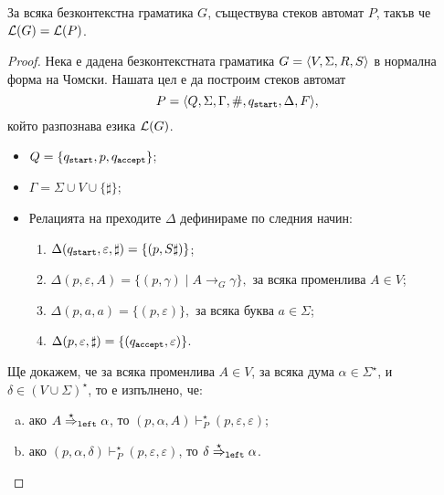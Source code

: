 \begin{important}
  \begin{lemma}
    За всяка безконтекстна граматика $G$,
    съществува стеков автомат $P$, такъв че $\mathcal{L}(G) = \mathcal{L}(P)$.
  \end{lemma}
\end{important}
\begin{proof}
  Нека е дадена безконтекстната граматика $G = \langle{V,\Sigma,R,S}\rangle$ в нормална форма на Чомски.
  Нашата цел е да построим стеков автомат
  \[P = \langle{Q,\Sigma,\Gamma,\#,q_{\texttt{start}},\Delta,F}\rangle,\] който разпознава езика $\mathcal{L}(G)$.
  \begin{itemize}
  \item
    $Q = \{q_{\texttt{start}},p,q_{\texttt{accept}}\}$;
  \item
    $\Gamma = \Sigma \cup V \cup \{\sharp\}$;
  \item
    Релацията на преходите $\Delta$ дефинираме по следния начин:
    \begin{enumerate}[(1)]
    \item 
      $\Delta(q_{\texttt{start}}, \varepsilon, \sharp ) = \{(p,S\sharp)\}$;
    \item
      $\Delta(p,\varepsilon,A) = \{(p,\gamma)\mid A\to_G \gamma\}, \text{ за всяка променлива }A \in V$;
    \item
      $\Delta(p,a,a) = \{(p,\varepsilon)\}, \text{ за всяка буква } a \in \Sigma$;
    \item
      $\Delta(p,\varepsilon,\sharp) = \{(q_{\texttt{accept}}, \varepsilon)\}$.
    \end{enumerate}
  \end{itemize}

  Ще докажем, че за всяка променлива $A \in V$, за всяка дума $\alpha \in \Sigma^\star$,
  и $\delta \in (V \cup \Sigma)^\star$, то е изпълнено, че:
  \begin{enumerate}[(a)]
  \item
    ако $A \stackrel{{\star}}{\Rightarrow}_{\texttt{left}} \alpha$, то $(p, \alpha, A) \vdash^\star_P (p, \varepsilon, \varepsilon)$;
  \item
    ако $(p, \alpha, \delta) \vdash^\star_P (p, \varepsilon, \varepsilon)$, то $\delta \stackrel{{\star}}{\Rightarrow}_{\texttt{left}} \alpha$.
  \end{enumerate}
  

\end{proof}

